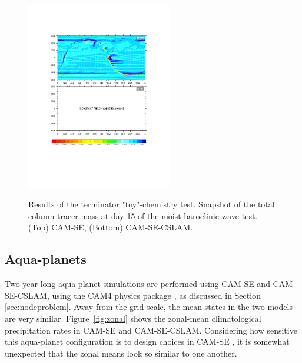 \documentclass[twocol]{ametsoc}
\begin{document}
\begin{figure}[t]
\begin{center}
\noindent\includegraphics[width=15pc,angle=0]{figs/terminator_iCLy.pdf}\\
\end{center}
\caption{Results of the terminator "toy"-chemistry test. Snapshot of the total column tracer mass at day 15 of the moist baroclinic wave test. (Top) CAM-SE, (Bottom) CAM-SE-CSLAM.}
\label{fig:term}
\end{figure}

\subsection{{\color{red}Aqua-planets{}}}

{\color{red}Two year long aqua-planet simulations are performed using CAM-SE and CAM-SE-CSLAM, using the CAM4 physics package \citep{CAM4}, as discussed in Section \ref{sec:nodeproblem}. Away from the grid-scale, the mean states in the two models are very similar. Figure~\ref{fig:zonal} shows the zonal-mean climatological precipitation rates in CAM-SE and CAM-SE-CSLAM. Considering how sensitive this aqua-planet configuration is to design choices in CAM-SE \citep{LetAl2018JAMES}, it is somewhat unexpected that the zonal means look so similar to one another.{}} 
\end{document}
